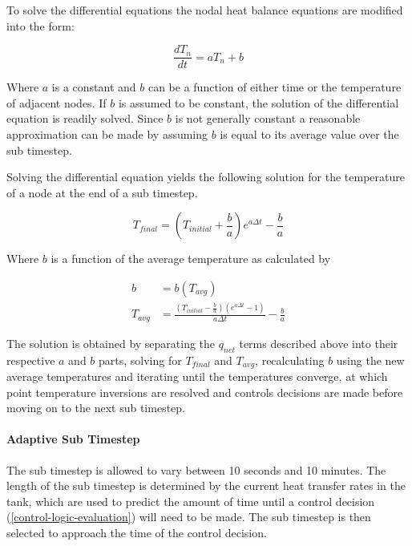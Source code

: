 To solve the differential equations the nodal heat balance equations are modified into the form:

\begin{equation}\label{strat-tank-diffeq}
  \frac{d{T_n}}{dt} = a T_n + b
\end{equation}

Where $a$ is a constant and $b$ can be a function of either time or the temperature of adjacent nodes. If $b$ is assumed to be constant, the solution of the differential equation is readily solved. Since $b$ is not generally constant a reasonable approximation can be made by assuming $b$ is equal to its average value over the sub timestep. 

Solving the differential equation yields the following solution for the temperature of a node at the end of a sub timestep. 

\begin{equation}
  T_{final} = \left( T_{initial} + \frac{b}{a} \right) e ^ {a \Delta t} - \frac{b}{a}
\end{equation}

Where $b$ is a function of the average temperature as calculated by

\begin{equation}
  \begin{array}{rl}
    b &= b(T_{avg}) \\
    T_{avg} &= \frac{(T_{initial} - \frac{b}{a}) (e ^ {a \Delta t} - 1)}{a \Delta t} - \frac{b}{a}
  \end{array}
\end{equation}

The solution is obtained by separating the $q_{net}$ terms described above into their respective $a$ and $b$ parts, solving for $T_{final}$ and $T_{avg}$, recalculating $b$ using the new average temperatures and iterating until the temperatures converge, at which point temperature inversions are resolved and controls decisions are made before moving on to the next sub timestep.

\paragraph{Adaptive Sub Timestep}

The sub timestep is allowed to vary between 10 seconds and 10 minutes. The length of the sub timestep is determined by the current heat transfer rates in the tank, which are used to predict the amount of time until a control decision (\ref{control-logic-evaluation}) will need to be made. The sub timestep is then selected to approach the time of the control decision.

